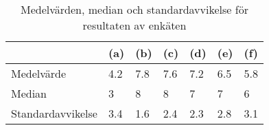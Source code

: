 \begin{table}
    \centering
    \begin{tabular}{| l | l | l | l | l | l | l |}
        \cline{2-7}
        \multicolumn{1}{c|}{} & (a) & (b) & (c) & (d) & (e) & (f) \\ \hline
        Medelvärde & 4.2 & 7.8 & 7.6 & 7.2 & 6.5 & 5.8  \\ \hline
        Median & 3 & 8 & 8 & 7 & 7 & 6  \\ \hline
        Standardavvikelse & 3.4 & 1.6 & 2.4 & 2.3 & 2.8 & 3.1  \\ \hline
    \end{tabular}
    \caption{Medelvärden, median och standardavvikelse för resultaten av enkäten}
    \label{tab:poll_results_table}
\end{table}

